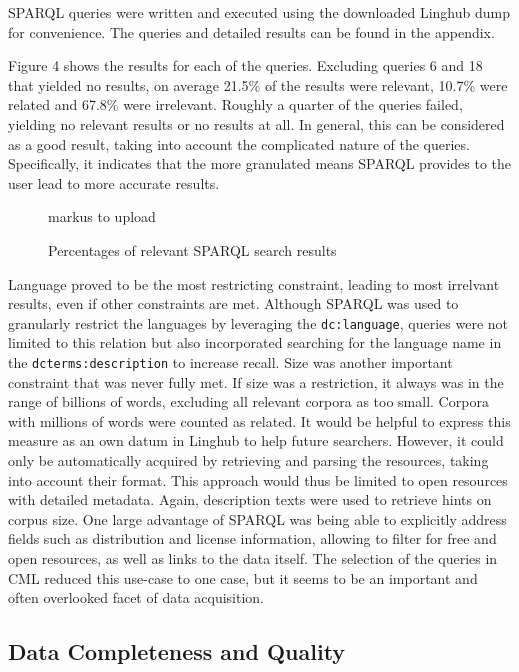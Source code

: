 \documentclass[smallextended]{svjour3}       %
\begin{document}
SPARQL queries were written and executed using the downloaded Linghub dump for
convenience. The queries and detailed results can be found in the appendix.

Figure 4 shows the results for each of the queries. Excluding queries 6 and 18
that yielded no results, on average 21.5\% of the results were relevant, 10.7\%
were related and 67.8\% were irrelevant. Roughly a quarter of the queries
failed, yielding no relevant results or no results at all. In general, this can
be considered as a good result, taking into account the complicated nature of
the queries. Specifically, it indicates that the more granulated means SPARQL
provides to the user lead to more accurate results. 

\begin{figure}
    markus to upload
    \caption{\label{fig:sparql}Percentages of relevant SPARQL search results}
\end{figure}

Language proved to be the most restricting constraint, leading to most irrelvant
results, even if other constraints are met. Although SPARQL was used to
granularly restrict the 
languages by leveraging the \texttt{dc:language}, queries were not limited to
this relation but also incorporated searching for the language name in the
\texttt{dcterms:description} to increase recall. 
Size was another important constraint that was never fully met. If size was a
restriction, it always was in the range of billions of words, excluding all
relevant corpora as too small. Corpora with millions of words were counted as
related. It would be helpful to express this measure as an own datum in Linghub
to help future searchers. However, it could only be automatically acquired by
retrieving and parsing the resources, taking into account their format. This
approach would thus be limited to open resources with detailed metadata. Again,
description texts were used to retrieve hints on corpus size.
One large advantage of SPARQL was being able to explicitly address fields such
as distribution and license information, allowing to filter for free and open
resources, as well as links to the data itself. The selection of the queries in
CML reduced this use-case to one case, but it seems to be an important and often
overlooked facet of data acquisition. 

\subsection{Data Completeness and Quality}
\end{document}

